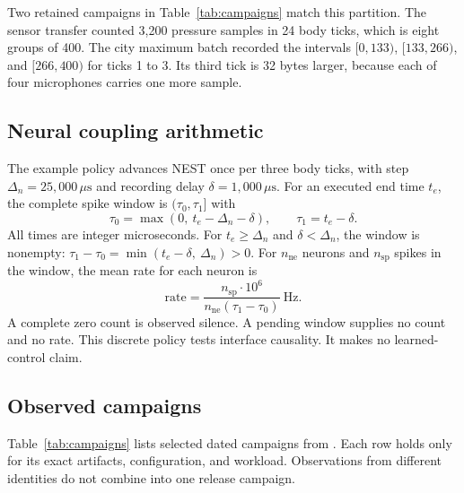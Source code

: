 \documentclass[11pt,a4paper]{article}
\theoremstyle{definition}
\begin{document}
Two retained campaigns in Table~\ref{tab:campaigns} match this partition. The sensor
transfer counted 3,200 pressure samples in 24 body ticks, which is eight groups of 400.
The city maximum batch recorded the intervals $[0,133)$, $[133,266)$, and $[266,400)$
for ticks 1 to 3. Its third tick is 32 bytes larger, because each of four microphones
carries one more sample.

\subsection{Neural coupling arithmetic}

The example policy advances NEST once per three body ticks, with step
$\Delta_n=25{,}000\,\mu\mathrm{s}$ and recording delay $\delta=1{,}000\,\mu\mathrm{s}$.
For an executed end time $t_e$, the complete spike window is $(\tau_0,\tau_1]$ with
\begin{equation}\label{eq:spike-window}
\tau_0=\max(0,\ t_e-\Delta_n-\delta),\qquad \tau_1=t_e-\delta.
\end{equation}
All times are integer microseconds. For $t_e\geq\Delta_n$ and $\delta<\Delta_n$, the
window is nonempty: $\tau_1-\tau_0=\min(t_e-\delta,\ \Delta_n)>0$. For $n_{\mathrm{ne}}$
neurons and $n_{\mathrm{sp}}$ spikes in the window, the mean rate for each neuron is
\begin{equation}\label{eq:spike-rate}
\mathrm{rate}=\frac{n_{\mathrm{sp}}\cdot10^{6}}{n_{\mathrm{ne}}(\tau_1-\tau_0)}\
\mathrm{Hz}.
\end{equation}
A complete zero count is observed silence. A pending window supplies no count and no
rate. This discrete policy tests interface causality. It makes no learned-control claim.

\subsection{Observed campaigns}

Table~\ref{tab:campaigns} lists selected dated campaigns from
. Each row holds only for its exact artifacts,
configuration, and workload. Observations from different identities do not combine
into one release campaign.
\end{document}
